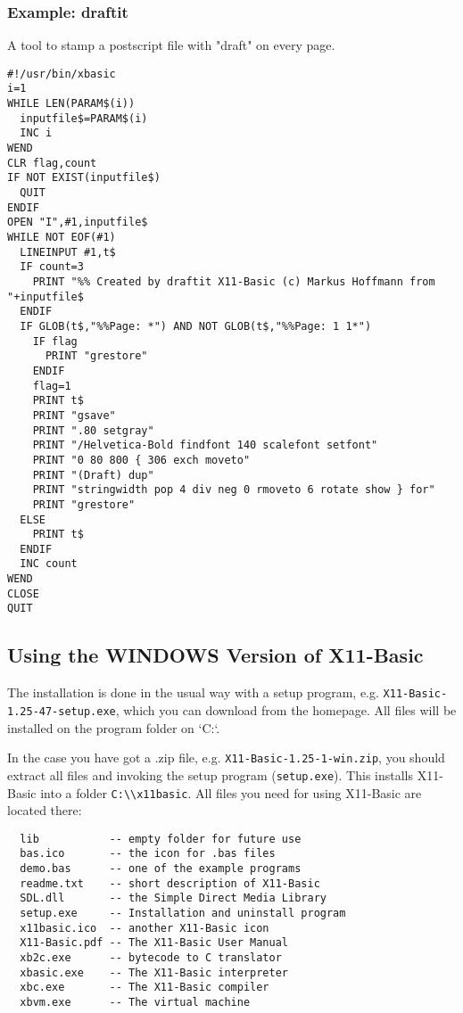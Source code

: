 \begin{mdframed}[hidealllines=true,backgroundcolor=blue!20]
\subsubsection*{Example: draftit} A tool to stamp a postscript file
with "draft" on every page.
{\footnotesize
\begin{verbatim}
#!/usr/bin/xbasic
i=1
WHILE LEN(PARAM$(i))
  inputfile$=PARAM$(i)
  INC i
WEND
CLR flag,count
IF NOT EXIST(inputfile$)
  QUIT
ENDIF  
OPEN "I",#1,inputfile$
WHILE NOT EOF(#1)
  LINEINPUT #1,t$
  IF count=3
    PRINT "%% Created by draftit X11-Basic (c) Markus Hoffmann from "+inputfile$
  ENDIF
  IF GLOB(t$,"%%Page: *") AND NOT GLOB(t$,"%%Page: 1 1*")
    IF flag
      PRINT "grestore"
    ENDIF
    flag=1
    PRINT t$
    PRINT "gsave"
    PRINT ".80 setgray"
    PRINT "/Helvetica-Bold findfont 140 scalefont setfont"
    PRINT "0 80 800 { 306 exch moveto"
    PRINT "(Draft) dup"
    PRINT "stringwidth pop 4 div neg 0 rmoveto 6 rotate show } for"
    PRINT "grestore"
  ELSE 
    PRINT t$
  ENDIF
  INC count
WEND
CLOSE
QUIT
\end{verbatim}
}
\end{mdframed}

\subsection{Using the WINDOWS Version of X11-Basic}

The installation is done in the usual way with a setup program, e.g.
\verb|X11-Basic-1.25-47-setup.exe|, which you can download from the homepage.
All files will be installed on the program folder on `C:`.

In the case you have got a .zip file, e.g. \verb|X11-Basic-1.25-1-win.zip|, 
you should extract all files and invoking the setup program (\verb|setup.exe|). 
This installs X11-Basic into a folder  \verb|C:\\x11basic|.  
All files you need for
using X11-Basic are located there:

\begin{verbatim}
  lib           -- empty folder for future use
  bas.ico       -- the icon for .bas files
  demo.bas      -- one of the example programs
  readme.txt    -- short description of X11-Basic
  SDL.dll       -- the Simple Direct Media Library
  setup.exe     -- Installation and uninstall program
  x11basic.ico  -- another X11-Basic icon
  X11-Basic.pdf -- The X11-Basic User Manual
  xb2c.exe      -- bytecode to C translator
  xbasic.exe    -- The X11-Basic interpreter
  xbc.exe       -- The X11-Basic compiler
  xbvm.exe      -- The virtual machine
\end{verbatim}

